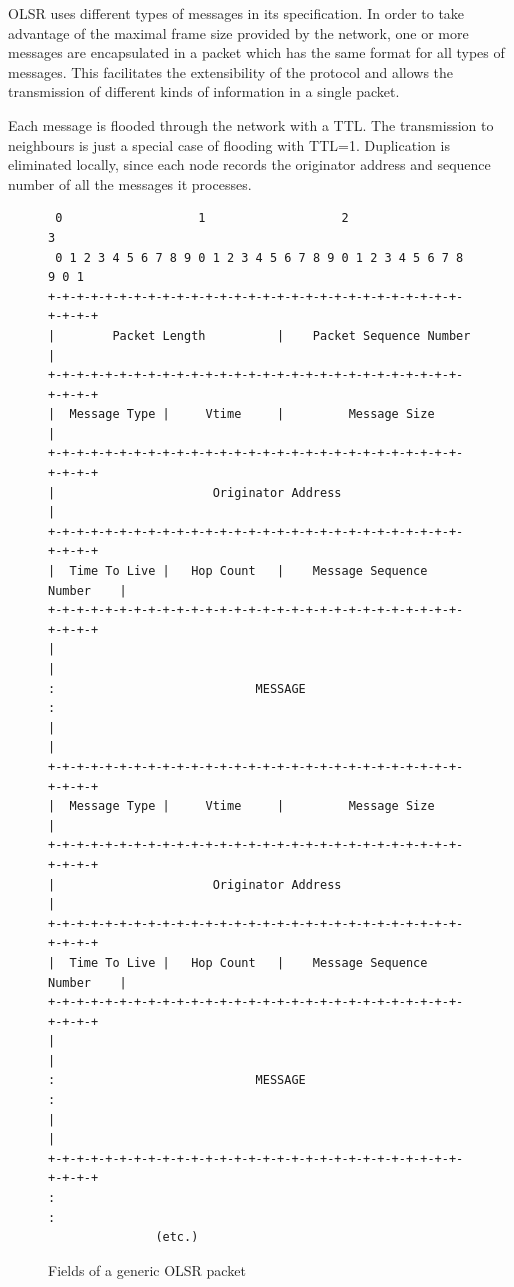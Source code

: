 \documentclass[oneside,openany]{memoir}
\begin{document}
OLSR uses different types of messages in its specification. In order to
take advantage of the maximal frame size provided by the network, one or
more messages are encapsulated in a packet which has the same format for
all types of messages. This facilitates the extensibility of the
protocol and allows the transmission of different kinds of information
in a single packet.

Each message is flooded through the network with a TTL. The transmission
to neighbours is just a special case of flooding with TTL=1. Duplication is
eliminated locally, since each node records the originator address and
sequence number of all the messages it processes.

\begin{figure}
\begin{verbatim}
 0                   1                   2                   3
 0 1 2 3 4 5 6 7 8 9 0 1 2 3 4 5 6 7 8 9 0 1 2 3 4 5 6 7 8 9 0 1
+-+-+-+-+-+-+-+-+-+-+-+-+-+-+-+-+-+-+-+-+-+-+-+-+-+-+-+-+-+-+-+-+
|        Packet Length          |    Packet Sequence Number     |
+-+-+-+-+-+-+-+-+-+-+-+-+-+-+-+-+-+-+-+-+-+-+-+-+-+-+-+-+-+-+-+-+
|  Message Type |     Vtime     |         Message Size          | 
+-+-+-+-+-+-+-+-+-+-+-+-+-+-+-+-+-+-+-+-+-+-+-+-+-+-+-+-+-+-+-+-+
|                      Originator Address                       |
+-+-+-+-+-+-+-+-+-+-+-+-+-+-+-+-+-+-+-+-+-+-+-+-+-+-+-+-+-+-+-+-+
|  Time To Live |   Hop Count   |    Message Sequence Number    |
+-+-+-+-+-+-+-+-+-+-+-+-+-+-+-+-+-+-+-+-+-+-+-+-+-+-+-+-+-+-+-+-+
|                                                               |
:                            MESSAGE                            :
|                                                               |
+-+-+-+-+-+-+-+-+-+-+-+-+-+-+-+-+-+-+-+-+-+-+-+-+-+-+-+-+-+-+-+-+
|  Message Type |     Vtime     |         Message Size          | 
+-+-+-+-+-+-+-+-+-+-+-+-+-+-+-+-+-+-+-+-+-+-+-+-+-+-+-+-+-+-+-+-+
|                      Originator Address                       |
+-+-+-+-+-+-+-+-+-+-+-+-+-+-+-+-+-+-+-+-+-+-+-+-+-+-+-+-+-+-+-+-+
|  Time To Live |   Hop Count   |    Message Sequence Number    |
+-+-+-+-+-+-+-+-+-+-+-+-+-+-+-+-+-+-+-+-+-+-+-+-+-+-+-+-+-+-+-+-+
|                                                               |
:                            MESSAGE                            :
|                                                               |
+-+-+-+-+-+-+-+-+-+-+-+-+-+-+-+-+-+-+-+-+-+-+-+-+-+-+-+-+-+-+-+-+
:                                                               :
               (etc.)
\end{verbatim}
\caption{Fields of a generic OLSR packet}
\end{figure}
\end{document}
